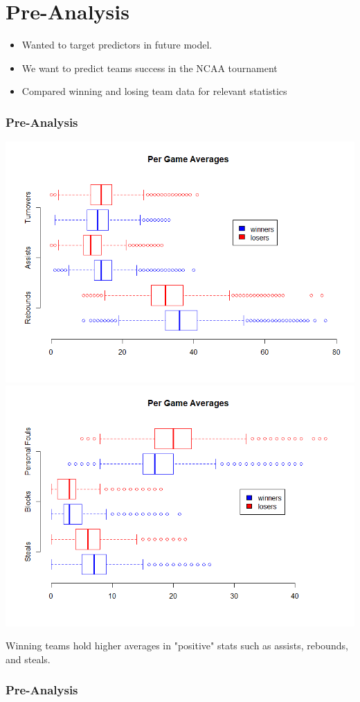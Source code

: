 \documentclass[11pt]{beamer}
\begin{document}
\section{Pre-Analysis}
\begin{frame}
\begin{itemize}
	\item Wanted to target predictors in future model.
	\item We want to predict teams success in the NCAA tournament
	\item Compared winning and losing team data for relevant statistics
\end{itemize}
\frametitle{{\textbf{\huge Pre-Analysis}}}
\end{frame}
\begin{frame}
	\begin{center}
		\includegraphics[scale=0.255]{GameAverages.png}
		\includegraphics[scale=0.255]{GameAverages2.png}  
	\end{center}
\footnotesize \center  Winning teams hold higher averages in "positive" stats such as assists, rebounds, and steals. 
\frametitle{{\textbf{\huge Pre-Analysis}}}
\end{frame}
\end{document}
